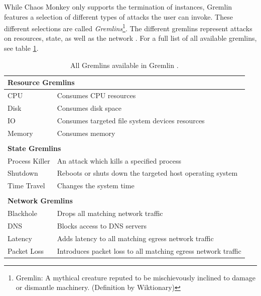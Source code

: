\documentclass{article}
\begin{document}
While Chaos Monkey only supports the termination of instances, Gremlin features a selection of different types of attacks the user can invoke. These different selections are called \textit{Gremlins}\footnote{Gremlin: A mythical creature reputed to be mischievously inclined to damage or dismantle machinery. (Definition by Wiktionary)}. The different gremlins represent attacks on resources, state, as well as the network \cite{gremlinManual}. For a full list of all available gremlins, see table \ref{tab:gremlins}.

\begin{table}[h]
\centering
\caption {All Gremlins available in Gremlin \cite{gremlinManual}.}
\begin{tabular}{ll}
\multicolumn{2}{l}{\textbf{Resource Gremlins}}                                 \\ \hline
CPU            & Consumes CPU resources                                        \\
Disk           & Consumes disk space                                           \\
IO             & Consumes targeted file system devices resources               \\
Memory         & Consumes memory                                               \\
               &                                                               \\
\multicolumn{2}{l}{\textbf{State Gremlins}}                                    \\ \hline
Process Killer & An attack which kills a specified process                     \\
Shutdown       & Reboots or shuts down the targeted host operating system      \\
Time Travel    & Changes the system time                                       \\
               &                                                               \\
\multicolumn{2}{l}{\textbf{Network Gremlins}}                                  \\ \hline
Blackhole      & Drops all matching network traffic                            \\
DNS            & Blocks access to DNS servers                                  \\
Latency        & Adds latency to all matching egress network traffic           \\
Packet Loss    & Introduces packet loss to all matching egress network traffic
\end{tabular}
\label{tab:gremlins}
\end{table}
\end{document}
